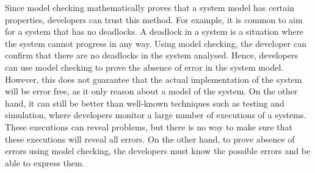 Since model checking mathematically proves that a system model has certain properties, developers can trust this method. For example, it is common to aim for a system that has no deadlocks. A deadlock in a system is a situation where the system cannot progress in any way. 
Using model checking, the developer can confirm that there are no deadlocks in the system analysed. Hence, developers can use model checking to prove the absence of error in the system model. However, this does not guarantee that the actual implementation of the system will be error free, as it only reason about a model of the system. On the other hand, it can still be better than well-known techniques such as testing and simulation, where developers monitor a large number of executions of a systems. 
These executions can reveal problems, but there is no way to make sure that these executions will reveal all errors. On the other hand, to prove absence of errors using model checking, the developers must know the possible errors and be able to express them. 

